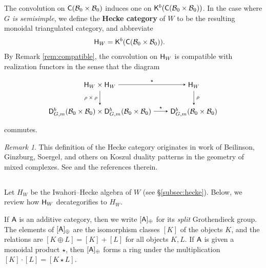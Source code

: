 \documentclass[a4paper,10pt,leqno]{amsart}
\theoremstyle{plain}
\theoremstyle{plain}
\theoremstyle{plain}
\theoremstyle{definition}
\theoremstyle{remark}
\newtheorem{rem}[thm]{Remark}
\newcommand{\dfemph}[1]{\textbf{#1}}
\begin{document}
The convolution on $\sf{C}(\cal{B}_0 \times \cal{B}_0)$ induces one on $\sf{K}^b(\sf{C}(\cal{B}_0 \times \cal{B}_0))$.
In the case where \emph{$G$ is semisimple}, we define the \dfemph{Hecke category} of $W$ to be the resulting monoidal triangulated category, and abbreviate
\begin{align}\begin{split}
\sf{H}_W
&= \sf{K}^b(\sf{C}(\cal{B}_0 \times \cal{B}_0)).
\end{split}\end{align}
By Remark \ref{rem:compatible}, the convolution on $\sf{H}_W$ is compatible with realization functors in the sense that the diagram
\begin{equation}\label{eq:convolution-realization}
\begin{tikzpicture}[baseline=(current bounding box.center), >=stealth]
\matrix(m)[matrix of math nodes, row sep=2em, column sep=2em, text height=2ex, text depth=0.5ex]
{	\sf{H}_W \times \sf{H}_W
		&\sf{H}_W\\
	\sf{D}_{G, m}^b(\cal{B}_0 \times \cal{B}_0) \times \sf{D}_{G, m}^b(\cal{B}_0 \times \cal{B}_0)
		&\sf{D}_{G, m}^b(\cal{B}_0 \times \cal{B}_0)\\
		};
\path[->,font=\scriptsize, auto]
(m-1-1)		edge node{$\star$} (m-1-2)
(m-2-1)		edge node{$\star$} (m-2-2)
(m-1-1)		edge node[left]{$\rho \times \rho$} (m-2-1)
(m-1-2)		edge node{$\rho$} (m-2-2);
\end{tikzpicture}
\end{equation}
commutes.

\begin{rem}
This definition of the Hecke category originates in work of Beilinson, Ginzburg, Soergel, and others on Koszul duality patterns in the geometry of mixed complexes.
See \cite[\S{4}]{bgs} and the references therein.
\end{rem}

\subsection{}\label{subsec:decat}

Let $H_W$ be the Iwahori--Hecke algebra of $W$ (see \S\ref{subsec:hecke}).
Below, we review how $\sf{H}_W$ decategorifies to $H_W$.

If $\sf{A}$ is an additive category, then we write $[\sf{A}]_\oplus$ for its \emph{split} Grothendieck group.
The elements of $[\sf{A}]_\oplus$ are the isomorphism classes $[K]$ of the objects $K$, and the relations are $[K \oplus L] = [K] + [L]$ for all objects $K, L$.
If $\sf{A}$ is given a monoidal product $\star$, then $[\sf{A}]_\oplus$ forms a ring under the multiplication $[K] \cdot [L] = [K \star L]$.
\end{document}

